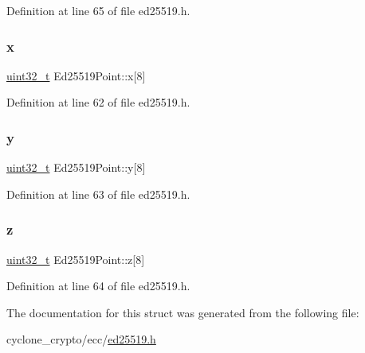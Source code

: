 Definition at line 65 of file ed25519.\+h.

\mbox{\label{structEd25519Point_ada4075918f73fe13ceaf4b3631549ce8}} 
\subsubsection{\texorpdfstring{x}{x}}
{\footnotesize\ttfamily \hyperlink{stdint_8h_a435d1572bf3f880d55459d9805097f62}{uint32\+\_\+t} Ed25519\+Point\+::x\mbox{[}8\mbox{]}}



Definition at line 62 of file ed25519.\+h.

\mbox{\label{structEd25519Point_a54af56f591402668e6a50d1ae0d4fcd0}} 
\subsubsection{\texorpdfstring{y}{y}}
{\footnotesize\ttfamily \hyperlink{stdint_8h_a435d1572bf3f880d55459d9805097f62}{uint32\+\_\+t} Ed25519\+Point\+::y\mbox{[}8\mbox{]}}



Definition at line 63 of file ed25519.\+h.

\mbox{\label{structEd25519Point_ab7af3d9e39f190e82b2927bdc269ba98}} 
\subsubsection{\texorpdfstring{z}{z}}
{\footnotesize\ttfamily \hyperlink{stdint_8h_a435d1572bf3f880d55459d9805097f62}{uint32\+\_\+t} Ed25519\+Point\+::z\mbox{[}8\mbox{]}}



Definition at line 64 of file ed25519.\+h.



The documentation for this struct was generated from the following file\+:\begin{DoxyCompactItemize}
\item 
cyclone\+\_\+crypto/ecc/\hyperlink{ed25519_8h}{ed25519.\+h}\end{DoxyCompactItemize}
